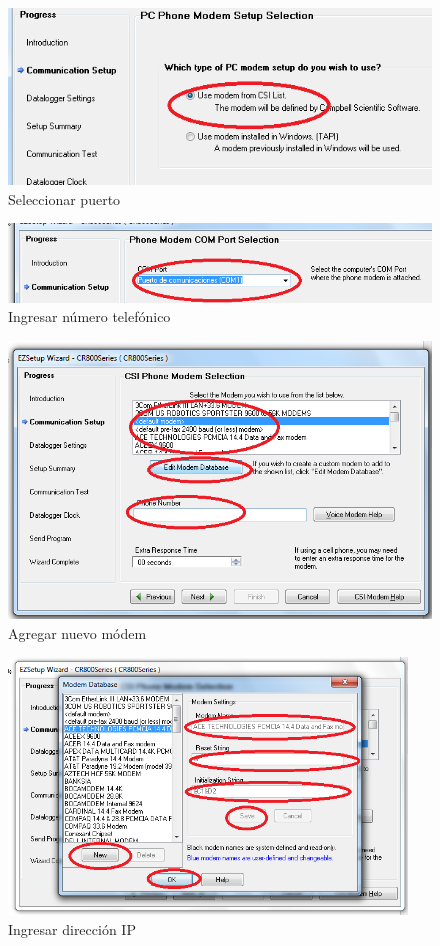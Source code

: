 \begin{figure}[h!]
        \centering
        \includegraphics[width=320pt]{images/modem2}
        \caption{Seleccionar puerto}
        \label{modem2}
\end{figure}
\newpage

\begin{figure}[h!]
        \centering
        \includegraphics[width=320pt]{images/modem3}
        \caption{Ingresar número telefónico}
        \label{modem3}
\end{figure}
\begin{figure}[h!]
        \centering
        \includegraphics[width=320pt]{images/modem4}
        \caption{Agregar nuevo módem}
        \label{modem4}
\end{figure}

\newpage
\begin{figure}[h!]
        \centering
        \includegraphics[width=300pt]{images/modem5}
        \caption{Ingresar dirección IP}
        \label{modem5}
\end{figure}

